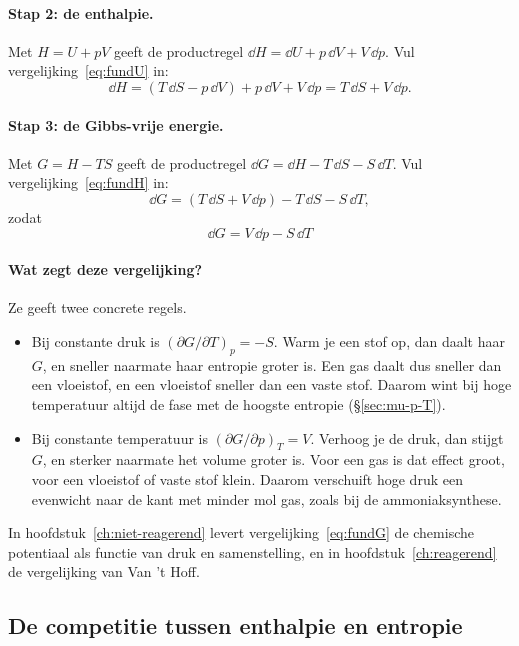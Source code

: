 \paragraph{Stap 2: de enthalpie.} Met $H = U + pV$ geeft de productregel $\dd H = \dd U + p\,\dd V + V\,\dd p$. Vul vergelijking~\eqref{eq:fundU} in:
\begin{equation}
\dd H = (T\,\dd S - p\,\dd V) + p\,\dd V + V\,\dd p = T\,\dd S + V\,\dd p.
\label{eq:fundH}
\end{equation}

\paragraph{Stap 3: de Gibbs-vrije energie.} Met $G = H - TS$ geeft de productregel $\dd G = \dd H - T\,\dd S - S\,\dd T$. Vul vergelijking~\eqref{eq:fundH} in:
\[
\dd G = (T\,\dd S + V\,\dd p) - T\,\dd S - S\,\dd T,
\]
zodat
\begin{equation}\label{eq:fundG}
\boxed{\dd G = V\,\dd p - S\,\dd T}
\end{equation}

\paragraph{Wat zegt deze vergelijking?} Ze geeft twee concrete regels.
\begin{itemize}
\item Bij constante druk is $(\partial G/\partial T)_p = -S$. Warm je een stof op, dan daalt haar $G$, en sneller naarmate haar entropie groter is. Een gas daalt dus sneller dan een vloeistof, en een vloeistof sneller dan een vaste stof. Daarom wint bij hoge temperatuur altijd de fase met de hoogste entropie (\S\ref{sec:mu-p-T}).
\item Bij constante temperatuur is $(\partial G/\partial p)_T = V$. Verhoog je de druk, dan stijgt $G$, en sterker naarmate het volume groter is. Voor een gas is dat effect groot, voor een vloeistof of vaste stof klein. Daarom verschuift hoge druk een evenwicht naar de kant met minder mol gas, zoals bij de ammoniaksynthese.
\end{itemize}
In hoofdstuk~\ref{ch:niet-reagerend} levert vergelijking~\eqref{eq:fundG} de chemische potentiaal als functie van druk en samenstelling, en in hoofdstuk~\ref{ch:reagerend} de vergelijking van Van 't Hoff.

\subsection{De competitie tussen enthalpie en entropie}

